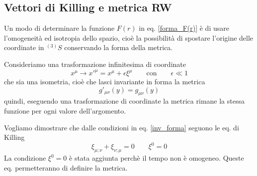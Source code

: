 \subsection{Vettori di Killing e metrica RW}

Un modo di determinare la funzione $F(r)$ in eq. \eqref{forma_F(r)} è di usare
l'omogeneità ed isotropia dello spazio, cioè la possibilità di spostare
l'origine delle coordinate in $^{(3)}S$ conservando la forma della metrica.

Consideriamo una trasformazione infinitesima di coordinate
\begin{equation}
  x^{\mu} \rightarrow x'^{\mu} = x^{\mu} + \epsilon \xi^{\mu}
  \qquad\text{con}\qquad \epsilon \ll 1
  \label{trasf_inf}
\end{equation}
che sia una isometria, cioè che lasci invariante in forma la metrica
\begin{equation}
  g'_{\mu \nu} (y) = g_{\mu \nu} (y)
  \label{inv_forma}
\end{equation}
quindi, eseguendo una trasformazione di coordinate la metrica rimane la stessa
funzione per ogni valore dell'argomento.

Vogliamo dimostrare che dalle condizioni in eq. \eqref{inv_forma} seguono le
eq. di Killing
\begin{equation}
  \xi_{\mu; \nu} + \xi_{\nu; \mu} = 0 \qquad\xi^0=0
  \label{eq_killing}
\end{equation}
La condizione $\xi^0=0$ è stata aggiunta perchè il tempo non è omogeneo.  Queste
eq. permetteranno di definire la metrica.

